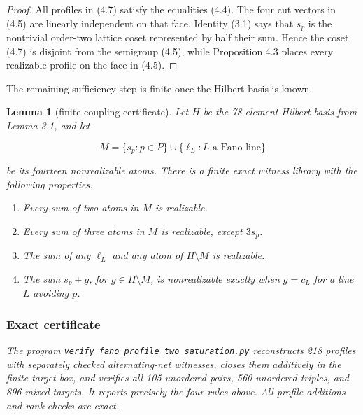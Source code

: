 \documentclass[11pt]{article}
\newtheorem{lemma}[theorem]{Lemma}
\theoremstyle{remark}
\numberwithin{equation}{section}
\begin{document}
\begin{proof}

All profiles in (4.7) satisfy the equalities (4.4). The four cut vectors in
(4.5) are linearly independent on that face. Identity (3.1) says that $s_p$ is
the nontrivial order-two lattice coset represented by half their sum. Hence the
coset (4.7) is disjoint from the semigroup (4.5), while Proposition 4.3 places
every realizable profile on the face in (4.5).
\end{proof}


The remaining sufficiency step is finite once the Hilbert basis is known.

\Needspace{0.28\textheight}
\begin{lemma}[finite coupling certificate]

Let $H$ be the 78-element Hilbert basis from Lemma 3.1, and let

\nopagebreak[4]
\[
M=\{s_p:p\in P\}\cup\{\ell_L:L\text{ a Fano line}\}
\]

be its fourteen nonrealizable atoms. There is a finite exact witness library
with the following properties.

\begin{enumerate}
\item Every sum of two atoms in $M$ is realizable.
\item Every sum of three atoms in $M$ is realizable, except $3s_p$.
\item The sum of any $\ell_L$ and any atom of $H\setminus M$ is realizable.
\item The sum $s_p+g$, for $g\in H\setminus M$, is nonrealizable exactly when
   $g=c_L$ for a line $L$ avoiding $p$.

\end{enumerate}

\subsubsection*{Exact certificate}


The program \nolinkurl{verify_fano_profile_two_saturation.py} reconstructs 218 profiles
with separately checked alternating-net witnesses, closes them additively in
the finite target box, and verifies all 105 unordered pairs, 560 unordered
triples, and 896 mixed targets. It reports precisely the four rules above. All
profile additions and rank checks are exact.

\end{lemma}
\end{document}
